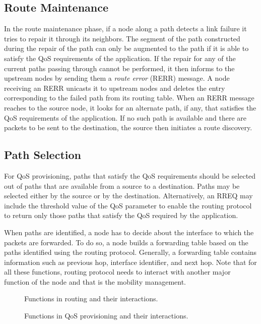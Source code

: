 \documentclass[10pt,times,epsfig,psfig,twocolumn,algorithm,algorithmic]{IEEEtran}
\begin{document}
\subsection{Route Maintenance}
In the route maintenance phase, if a node along a path detects a link failure it tries to repair it through its neighbors. The segment of the path constructed during the repair of the path can only be augmented to the path if it is able to satisfy the QoS requirements of the application. If the repair for any of the current paths passing through cannot be performed, it then informs to the upstream nodes by sending them a {\em route error} (RERR) message. A node receiving an RERR unicasts it to upstream nodes and deletes the entry corresponding to the failed path from its routing table. When an RERR message reaches to the source node, it looks for an alternate path, if any, that satisfies the QoS requirements of the application. If no such path is available and there are packets to be sent to the destination, the source then initiates a route discovery.

\subsection{Path Selection}
For QoS provisioning, paths that satisfy the QoS requirements should be selected out of paths that are available from a source to a destination. Paths may be selected either by the source or by the destination. Alternatively, an RREQ may include the threshold value of the QoS parameter to enable the routing protocol to return only those paths that satisfy the QoS required by the application.


When paths are identified, a node has to decide about the interface to which the packets are forwarded. To do so, a node builds a forwarding table based on the paths identified using the routing protocol. Generally, a forwarding table contains information such as previous hop, interface identifier, and next hop. Note that for all these functions, routing protocol needs to interact with another major function of the node and that is the mobility management. 

\begin{figure}
\centerline{}
\caption{Functions in routing and their interactions.}
\label{routing}
\end{figure}

\begin{figure}
\centerline{}
\caption{Functions in QoS provisioning and their interactions.}
\label{qos}
\end{figure}
\end{document}

